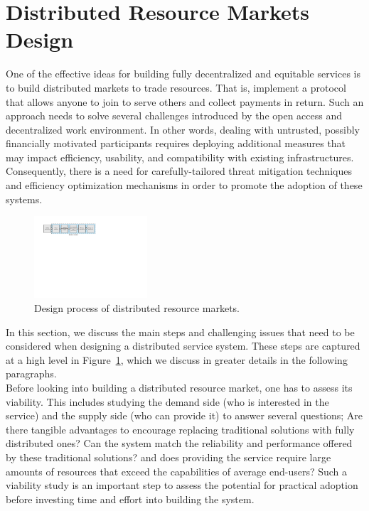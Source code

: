 \documentclass{llncs}
\begin{document}
\section{Distributed Resource Markets Design}
One of the effective ideas for building fully decentralized and equitable services is to build distributed markets to trade resources. That is, implement a protocol that allows anyone to join to serve others and collect payments in return. Such an approach needs to solve several challenges introduced by the open access and decentralized work environment. In other words, dealing with untrusted, possibly financially motivated participants requires deploying additional measures that may impact efficiency, usability, and compatibility with existing infrastructures. Consequently, there is a need for carefully-tailored threat mitigation techniques and efficiency optimization mechanisms in order to promote the adoption of these systems.


\begin{figure}[ht!]
\centerline{
\includegraphics[height= 1.2in, width = 1.0\columnwidth]{figures/design-steps.pdf}}
\caption{Design process of distributed resource markets.} \label{design-steps}
\vspace{-12pt}
\end{figure}


In this section, we discuss the main steps and challenging issues that need to be considered when designing a distributed service system. These steps are captured at a high level in Figure~\ref{design-steps}, which we discuss in greater details in the following paragraphs. \\


 Before looking into building a distributed resource market, one has to assess its viability. This includes studying the demand side (who is interested in the service) and the supply side (who can provide it) to answer several questions; Are there tangible advantages to encourage replacing traditional solutions with fully distributed ones? Can the system match the reliability and performance offered by these traditional solutions? and does providing the service require large amounts of resources that exceed the capabilities of average end-users? Such a viability study is an important step to assess the potential for practical adoption before investing time and effort into building the system. \\
\end{document}
